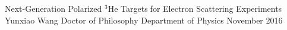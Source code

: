 \documentclass[pdftex,letterpaper,12pt]{report}
\begin{document}

\thesistitle
	{Next-Generation Polarized $^3$He Targetsfor Electron Scattering Experiments}
	{Yunxiao Wang}
	{Doctor of Philosophy}
	{Department of Physics}
	{November 2016}
















% 
	
\end{document}
